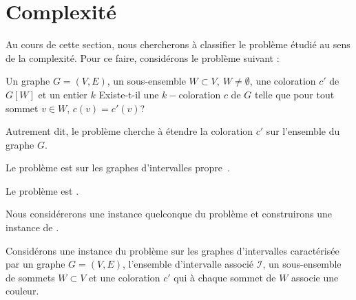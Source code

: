 \documentclass[a4paper,9pt]{report}
\begin{document}
\section{Complexité}
\label{scomplexite}

Au cours de cette section, nous chercherons à classifier le problème étudié au sens de la
complexité. Pour ce faire, considérons le problème suivant :

\dfdec{\precolor}
{Un graphe $G=(V, E)$, un sous-ensemble $W \subset V,\ W \neq \emptyset$, une coloration $c'$ de $G[W]$ et un
entier $k$}
{Existe-t-il une $k-$coloration $c$ de $G$ telle que pour tout sommet $v \in W$, $c(v) =
c'(v)$?}

Autrement dit, le problème \precolor cherche à étendre la coloration $c'$ sur l'ensemble du graphe
$G$.

\begin{nthrm}
    Le problème \precolor est \npc sur les graphes d'intervalles
    propre~\cite{marx2006precoloring}.
\end{nthrm}

\begin{nthrm}
    Le problème \fischedpi est \npc.
\end{nthrm}

Nous considérerons une instance quelconque du problème \precolor et construirons une instance de
\fischedpi.

Considérons une instance du problème \precolor sur les graphes d'intervalles caractérisée
par un graphe $G = (V,E)$, l'ensemble d'intervalle associé $\mathcal{I}$, un
sous-ensemble de sommets $W \subset V$ et une coloration $c'$ qui à chaque sommet de $W$ associe
une couleur. 
\end{document}
